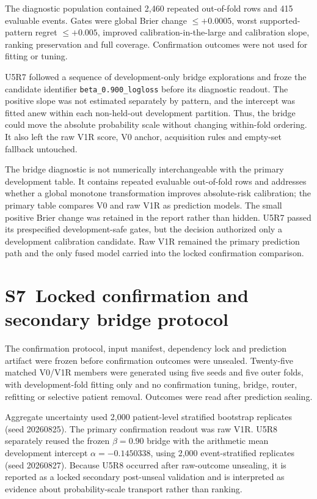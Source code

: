 The diagnostic population contained 2,460 repeated out-of-fold rows and 415 evaluable events. Gates were global Brier change $\le +0.0005$, worst supported-pattern regret $\le +0.005$, improved calibration-in-the-large and calibration slope, ranking preservation and full coverage. Confirmation outcomes were not used for fitting or tuning.

U5R7 followed a sequence of development-only bridge explorations and froze the candidate identifier \texttt{beta\_0.900\_logloss} before its diagnostic readout. The positive slope was not estimated separately by pattern, and the intercept was fitted anew within each non-held-out development partition. Thus, the bridge could move the absolute probability scale without changing within-fold ordering. It also left the raw V1R score, V0 anchor, acquisition rules and empty-set fallback untouched.

The bridge diagnostic is not numerically interchangeable with the primary development table. It contains repeated evaluable out-of-fold rows and addresses whether a global monotone transformation improves absolute-risk calibration; the primary table compares V0 and raw V1R as prediction models. The small positive Brier change was retained in the report rather than hidden. U5R7 passed its prespecified development-safe gates, but the decision authorized only a development calibration candidate. Raw V1R remained the primary prediction path and the only fused model carried into the locked confirmation comparison.

\section*{S7~Locked confirmation and secondary bridge protocol}
The confirmation protocol, input manifest, dependency lock and prediction artifact were frozen before confirmation outcomes were unsealed. Twenty-five matched V0/V1R members were generated using five seeds and five outer folds, with development-fold fitting only and no confirmation tuning, bridge, router, refitting or selective patient removal. Outcomes were read after prediction sealing.

Aggregate uncertainty used 2,000 patient-level stratified bootstrap replicates (seed 20260825). The primary confirmation readout was raw V1R. U5R8 separately reused the frozen $\beta=0.90$ bridge with the arithmetic mean development intercept $\alpha=-0.1450338$, using 2,000 event-stratified replicates (seed 20260827). Because U5R8 occurred after raw-outcome unsealing, it is reported as a locked secondary post-unseal validation and is interpreted as evidence about probability-scale transport rather than ranking.


